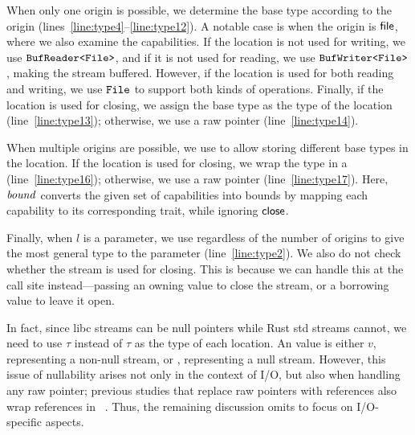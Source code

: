 When only one origin is possible, we determine the base type according to the
origin (lines~\ref{line:type4}--\ref{line:type12}).
%
A notable case is when the origin is ${\sf file}$, where we also examine the
capabilities.
%
If the location is not used for writing, we use {\small${\tt BufReader\texttt{<}File\texttt{>}}$}, and if it
is not used for reading, we use {\small${\tt BufWriter\texttt{<}File\texttt{>}}$}, making the stream
buffered.
%
However, if the location is used for both reading and writing, we use
{\small${\tt File}$} to support both kinds of operations.
%
Finally, if the location is used for closing, we assign the base type as the
type of the location (line~\ref{line:type13});
%
otherwise, we use a raw pointer (line~\ref{line:type14}).

When multiple origins are possible, we use  to allow storing different
base types in the location.
%
If the location is used for closing, we wrap the  type in a 
(line~\ref{line:type16});
%
otherwise, we use a raw pointer (line~\ref{line:type17}).
%
Here, ${\it bound}$ converts the given set of capabilities into bounds by
mapping each capability to its corresponding trait, while ignoring ${\sf close}$.

Finally, when $l$ is a parameter, we use  regardless of the number of
origins to give the most general type to the parameter (line~\ref{line:type2}).
%
We also do not check whether the stream is used for closing.
%
This is because we can handle this at the call site instead---passing an owning
value to close the stream, or a borrowing value to leave it open.
%


In fact, since libc streams can be null pointers while Rust std streams cannot,
we need to use \CT{<}$\tau$\CT{>} instead of $\tau$ as the type of
each location.
%
An  value is either $v$\C{)}, representing a non-null stream,
or , representing a null stream.
%
However, this issue of nullability arises not only in the context of I/O, but
also when handling any raw pointer;
%
previous studies that replace raw pointers with references also wrap references
in ~\cite{emre2021translating, emre2023aliasing, zhang2023ownership}.
%
Thus, the remaining discussion omits  to focus on I/O-specific
aspects.

